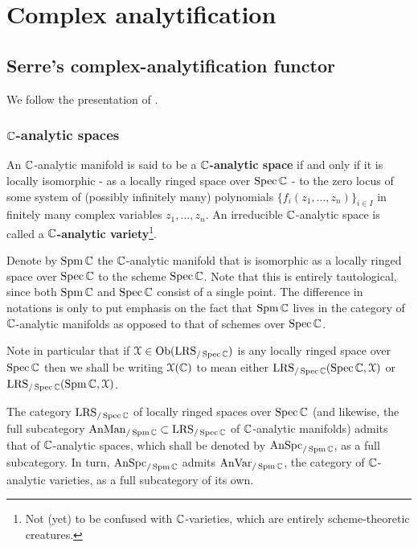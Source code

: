 \section{Complex analytification}
    \subsection{Serre's complex-analytification functor}
        We follow the presentation of \cite[Expos\'e XII]{SGA1}. 
        
        \subsubsection{\texorpdfstring{$\mathbb{C}$}{}-analytic spaces}
            \begin{definition} \label{def: complex_analytic_spaces}
                An $\mathbb{C}$-analytic manifold is said to be a \textbf{$\mathbb{C}$-analytic space} if and only if it is locally isomorphic - as a locally ringed space over $\operatorname{Spec} \mathbb{C}$ - to the zero locus of some system of (possibly infinitely many) polynomials $\{f_i(z_1, ..., z_n)\}_{i \in I}$ in finitely many complex variables $z_1, ..., z_n$. An irreducible $\mathbb{C}$-analytic space is called a \textbf{$\mathbb{C}$-analytic variety}\footnote{Not (yet) to be confused with $\mathbb{C}$-varieties, which are entirely scheme-theoretic creatures.}.
            \end{definition}
            \begin{convention}
                Denote by $\operatorname{Spm} \mathbb{C}$ the $\mathbb{C}$-analytic manifold that is isomorphic as a locally ringed space over $\operatorname{Spec} \mathbb{C}$ to the scheme $\operatorname{Spec} \mathbb{C}$. Note that this is entirely tautological, since both $\operatorname{Spm} \mathbb{C}$ and $\operatorname{Spec} \mathbb{C}$ consist of a single point. The difference in notations is only to put emphasis on the fact that $\operatorname{Spm} \mathbb{C}$ lives in the category of $\mathbb{C}$-analytic manifolds as opposed to that of schemes over $\operatorname{Spec} \mathbb{C}$.
                
                Note in particular that if $\mathcal{X} \in \mathrm{Ob}(\mathrm{LRS}_{/\operatorname{Spec} \mathbb{C}})$ is any locally ringed space over $\operatorname{Spec} \mathbb{C}$ then we shall be writing $\mathcal{X}(\mathbb{C})$ to mean either $\mathrm{LRS}_{/\operatorname{Spec} \mathbb{C}}(\operatorname{Spec} \mathbb{C}, \mathcal{X})$ or $\mathrm{LRS}_{/\operatorname{Spec} \mathbb{C}}(\operatorname{Spm} \mathbb{C}, \mathcal{X})$. 
            \end{convention}
            \begin{remark} \label{remark: the_category_of_complex_analytic_spaces}
                The category $\mathrm{LRS}_{/\operatorname{Spec} \mathbb{C}}$ of locally ringed spaces over $\operatorname{Spec} \mathbb{C}$ (and likewise, the full subcategory $\mathrm{An}\mathrm{Man}_{/\operatorname{Spm} \mathbb{C}} \subset \mathrm{LRS}_{/\operatorname{Spec} \mathbb{C}}$ of $\mathbb{C}$-analytic manifolds) admits that of $\mathbb{C}$-analytic spaces, which shall be denoted by $\mathrm{An}\mathrm{Spc}_{/\operatorname{Spm} \mathbb{C}}$, as a full subcategory. In turn, $\mathrm{An}\mathrm{Spc}_{/\operatorname{Spm} \mathbb{C}}$ admits $\mathrm{An}\mathrm{Var}_{/\operatorname{Spm} \mathbb{C}}$, the category of $\mathbb{C}$-analytic varieties, as a full subcategory of its own.
            \end{remark}
